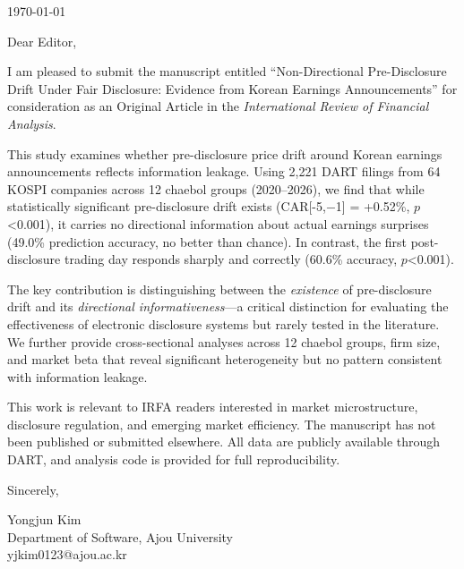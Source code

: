\documentclass[12pt]{article}
\begin{document}
\noindent\today

\vspace{1cm}

\noindent Dear Editor,

\vspace{0.5cm}

I am pleased to submit the manuscript entitled ``Non-Directional Pre-Disclosure Drift Under Fair Disclosure: Evidence from Korean Earnings Announcements'' for consideration as an Original Article in the \textit{International Review of Financial Analysis}.

This study examines whether pre-disclosure price drift around Korean earnings announcements reflects information leakage. Using 2,221 DART filings from 64 KOSPI companies across 12 chaebol groups (2020--2026), we find that while statistically significant pre-disclosure drift exists (CAR[-5,$-$1] = +0.52\%, $p$<0.001), it carries no directional information about actual earnings surprises (49.0\% prediction accuracy, no better than chance). In contrast, the first post-disclosure trading day responds sharply and correctly (60.6\% accuracy, $p$<0.001).

The key contribution is distinguishing between the \textit{existence} of pre-disclosure drift and its \textit{directional informativeness}---a critical distinction for evaluating the effectiveness of electronic disclosure systems but rarely tested in the literature. We further provide cross-sectional analyses across 12 chaebol groups, firm size, and market beta that reveal significant heterogeneity but no pattern consistent with information leakage.

This work is relevant to IRFA readers interested in market microstructure, disclosure regulation, and emerging market efficiency. The manuscript has not been published or submitted elsewhere. All data are publicly available through DART, and analysis code is provided for full reproducibility.

\vspace{0.5cm}

\noindent Sincerely,

\vspace{0.5cm}

\noindent Yongjun Kim\\
Department of Software, Ajou University\\
yjkim0123@ajou.ac.kr
\end{document}
